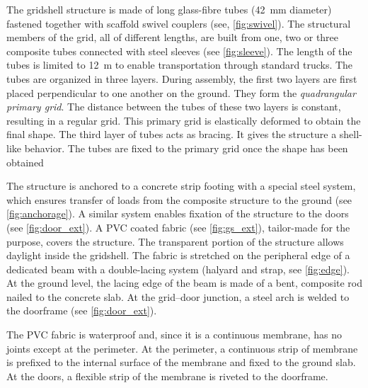 The gridshell structure is made of long glass-fibre tubes (42~mm diameter) fastened together with scaffold swivel couplers (see, \cref{fig:swivel}). The structural members of the grid, all of different lengths, are built  from one, two or three composite tubes connected with steel sleeves (see \cref{fig:sleeve}). The length of the tubes is limited to 12~m to enable transportation through standard trucks. The tubes are organized in three layers. During assembly, the first two layers are first placed perpendicular to one another on the ground. They form the \emph{quadrangular primary grid}. The distance between the tubes of these two layers is constant, resulting in a regular grid. This primary grid is elastically deformed to obtain the final shape. The third layer of tubes acts as bracing. It gives the structure a shell-like behavior. The tubes are fixed to the primary grid once the shape has been obtained

The structure is anchored to a concrete strip footing with a special steel system, which ensures transfer of loads from the composite structure to the ground (see \cref{fig:anchorage}). A similar system enables fixation of the structure to the doors (see \cref{fig:door_ext}). A PVC coated fabric (see \cref{fig:gs_ext}), tailor-made for the purpose, covers the structure. The transparent portion of the structure allows daylight inside the gridshell. The fabric is stretched on the peripheral edge of a dedicated beam with a double-lacing system (halyard and strap, see \cref{fig:edge}). At the ground level, the lacing edge of the beam is made of a bent, composite rod nailed to the concrete slab. At the grid–door junction, a steel arch is welded to the doorframe (see \cref{fig:door_ext}).

The PVC fabric is waterproof and, since it is a continuous membrane, has no joints except at the perimeter. At the perimeter, a continuous strip of membrane is prefixed to the internal surface of the membrane and fixed to the ground slab. At the doors, a flexible strip of the membrane is riveted to the doorframe.




